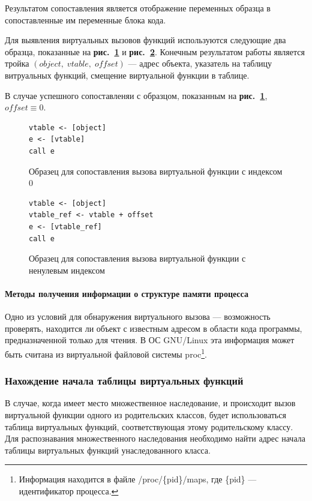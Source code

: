 \documentclass[a4paper,12pt,russian]{article}
\newcommand{\picref}[1]{\textbf{рис.~\ref{#1}}}
\newcommand{\code}[1]{\textsf{#1}}
\begin{document}
Результатом сопоставления является отображение переменных образца в сопоставленные им переменные блока кода.

Для выявления виртуальных вызовов функций используются следующие два образца, показанные на \picref{vcall_pattern_0_lst} и \picref{vcall_pattern_off_lst}. Конечным результатом работы является тройка $(object,\;vtable,\;offset)$ --- адрес объекта, указатель на таблицу витруальных функций, смещение виртуальной функции в таблице.

В случае успешного сопоставленяи с  образцом, показанным на \picref{vcall_pattern_0_lst}, $offset \equiv 0$.

\begin{figure}
\begin{lstlisting}
vtable <- [object]
e <- [vtable]
call e
\end{lstlisting}
\caption{Образец для сопоставления вызова виртуальной функции с индексом 0}
\label{vcall_pattern_0_lst}
\end{figure}
\begin{figure}
\begin{lstlisting}
vtable <- [object]
vtable_ref <- vtable + offset
e <- [vtable_ref]
call e
\end{lstlisting}
\caption{Образец для сопоставления вызова виртуальной функции с ненулевым индексом}
\label{vcall_pattern_off_lst}
\end{figure}

\paragraph{Методы получения информации о структуре памяти процесса}
\label{proc_map}
Одно из условий для обнаружения виртуального вызова --- возможность проверять, находится ли объект с известным адресом в области кода программы, предназначенной только для чтения.
В ОС GNU/Linux эта информация может быть считана из виртуальной файловой системы \code{proc}\footnote{Информация находится в файле \code{/proc/\{pid\}/maps}, где \code{\{pid\}} --- идентификатор процесса.}.

\subsubsection{Нахождение начала таблицы виртуальных функций}
\label{vtable_beginning_search}
В случае, когда имеет место множественное наследование, и происходит вызов виртуальной функции одного из родительских классов, будет использоваться таблица виртуальных функций, соответствующая этому родительскому классу.
Для распознавания множественного наследования необходимо найти адрес начала таблицы виртуальных функций унаследованного класса.
\end{document}
